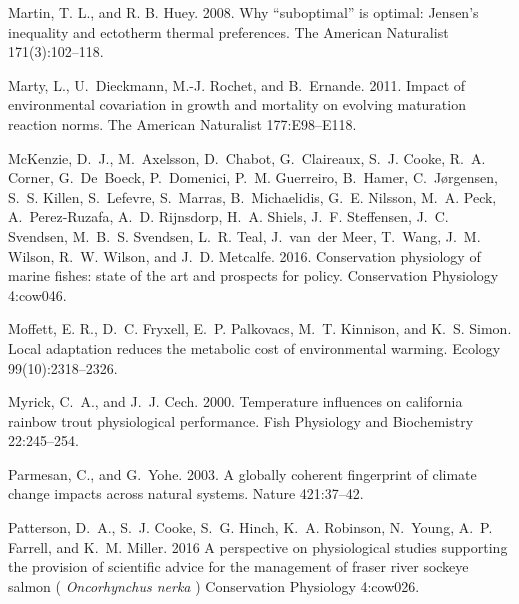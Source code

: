 \documentclass[11pt]{article}\usepackage[]{graphicx}\usepackage[]{color,soul}
\begin{document}
\begin{thebibliography}{62}
Martin, T. L., and R. B. Huey. 2008.
\newblock Why “suboptimal” is optimal: Jensen’s inequality and ectotherm thermal preferences. 
\newblock The American Naturalist 171(3):102--118.

Marty, L., U.~Dieckmann, M.-J. Rochet, and B.~Ernande. 2011.
\newblock Impact of environmental covariation in growth and mortality on
  evolving maturation reaction norms.
\newblock The American Naturalist 177:E98--E118.

{McKenzie}, D.~J., M.~Axelsson, D.~Chabot, G.~Claireaux, S.~J. Cooke, R.~A.
  Corner, G.~De~Boeck, P.~Domenici, P.~M. Guerreiro, B.~Hamer, C.~Jørgensen,
  S.~S. Killen, S.~Lefevre, S.~Marras, B.~Michaelidis, G.~E. Nilsson, M.~A.
  Peck, A.~Perez-Ruzafa, A.~D. Rijnsdorp, H.~A. Shiels, J.~F. Steffensen, J.~C.
  Svendsen, M.~B.~S. Svendsen, L.~R. Teal, J.~van~der Meer, T.~Wang, J.~M.
  Wilson, R.~W. Wilson, and J.~D. Metcalfe. 2016.
\newblock Conservation physiology of marine fishes: state of the art and
  prospects for policy. 
\newblock Conservation Physiology 4:cow046.
  
Moffett, E. R., D.~C. Fryxell, E.~P. Palkovacs, M.~T. Kinnison, and K.~S. Simon.
\newblock Local adaptation reduces the metabolic cost of environmental warming.
\newblock Ecology 99(10):2318--2326.

Myrick, C.~A., and J.~J. Cech. 2000.
\newblock Temperature influences on california rainbow trout physiological
  performance.
\newblock Fish Physiology and Biochemistry 22:245--254.

Parmesan, C., and G.~Yohe. 2003.
\newblock A globally coherent fingerprint of climate change impacts across
  natural systems.
\newblock Nature 421:37--42.

Patterson, D.~A., S.~J. Cooke, S.~G. Hinch, K.~A. Robinson, N.~Young, A.~P.
  Farrell, and K.~M. Miller. 2016
\newblock A perspective on physiological studies supporting the provision of
  scientific advice for the management of fraser river sockeye salmon (
  \textit{Oncorhynchus nerka} )
\newblock Conservation Physiology 4:cow026.


\end{thebibliography}
\end{document}
